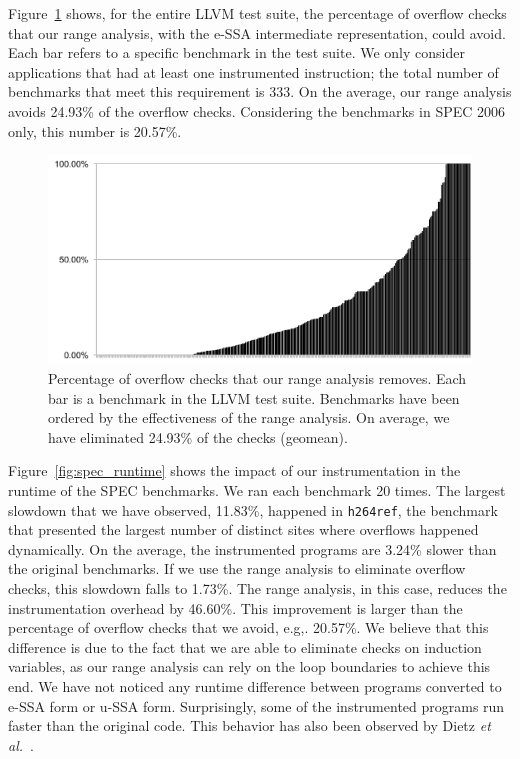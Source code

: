 \documentclass{sigplanconf}[10pt]
\begin{document}
Figure~\ref{fig:percentage_elimination} shows, for the entire LLVM test
suite, the percentage of overflow checks that our range analysis, with the
e-SSA intermediate representation, could avoid.
Each bar refers to a specific benchmark in the test suite.
We only consider applications that had at least one instrumented
instruction; the total number of benchmarks that meet this requirement is
333.
On the average, our range analysis avoids 24.93\% of the overflow checks.
Considering the benchmarks in SPEC 2006 only, this number is 20.57\%.

\begin{figure}[t!]
\begin{center}
\includegraphics[width=\columnwidth]{images/percentage_elimination}
\end{center}
\caption{\label{fig:percentage_elimination}
Percentage of overflow checks that our range analysis removes.
Each bar is a benchmark in the LLVM test suite.
Benchmarks have been ordered by the effectiveness of the range analysis.
On average, we have eliminated 24.93\% of the checks (geomean).}
\end{figure}

Figure~\ref{fig:spec_runtime} shows the impact of our instrumentation in the
runtime of the SPEC benchmarks.
We ran each benchmark 20 times.
The largest slowdown that we have observed, 11.83\%, happened in
\texttt{h264ref}, the benchmark that presented the largest number of distinct
sites where overflows happened dynamically. 
On the average, the instrumented programs are 3.24\% slower than the
original benchmarks.
If we use the range analysis to eliminate overflow checks, this slowdown falls
to 1.73\%.
The range analysis, in this case, reduces the instrumentation overhead by
46.60\%.
This improvement is larger than the percentage of overflow checks that we
avoid, e.g,. 20.57\%.
We believe that this difference is due to the fact that we are able to
eliminate checks on induction variables, as our range analysis can rely on
the loop boundaries to achieve this end.
We have not noticed any runtime difference between programs converted to
e-SSA form or u-SSA form.
Surprisingly, some of the instrumented programs run faster than the original
code.
This behavior has also been observed by Dietz {\em et al.}~\cite{Dietz12}.
\end{document}

